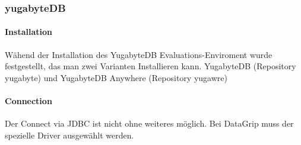 
\begin{flushleft}
    \subsubsection{yugabyteDB}
    \paragraph{Installation}
    Wähend der Installation des YugabyteDB Evaluations-Enviroment wurde festgestellt, das man zwei Varianten Installieren kann.
    YugabyteDB (Repository yugabyte) und YugabyteDB Anywhere (Repository yugawre)
    
    \paragraph{Connection}
    Der Connect via JDBC ist nicht ohne weiteres möglich.
    Bei DataGrip muss der spezielle Driver ausgewählt werden.
\end{flushleft}